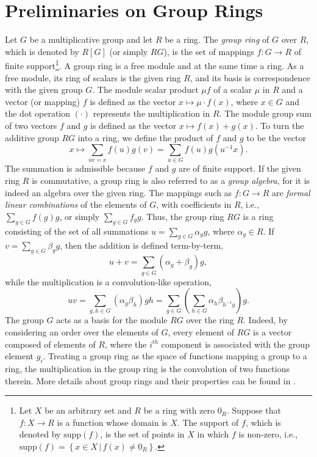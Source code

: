 \documentclass[journal,draftclsnofoot,onecolumn,12pt,twoside]{IEEEtran}
\begin{document}
\section{Preliminaries on Group Rings}\label{sec2}
Let $G$ be a multiplicative group and let $R$ be a ring. The \emph{group ring} of $G$ over $R$, which is denoted by $R[G]$ (or simply $RG$), is the set of mappings $f : G\rightarrow R$ of finite support\footnote{Let $X$ be an arbitrary set and $R$  be a ring with zero $0_R$. Suppose that $f : X\rightarrow R$ is a  function whose domain is $X$. The support of $f$, which is denoted by $\textrm{supp}(f)$, is the set of points in $X$ in which $f$ is non-zero, i.e., $\textrm{supp}(f)=\left\{x\in X\,|\,f(x)\neq 0_R\right\}$.}.
A group ring is a free module and at the same time a ring. As a free module, its ring of scalars is the given ring $R$, and its basis is correspondence with the given group $G$.
The module scalar product $\mu f$ of a scalar $\mu$ in $R$ and a vector (or mapping) $f$ is defined as the vector $ x\mapsto \mu \cdot f(x)$, where $x\in G$ and the dot operation $(\cdot)$ represents the multiplication in $R$.  The module group sum of two vectors $f$ and $g$ is defined as the vector  $x\mapsto f(x)+g(x)$. To turn the additive group $RG$ into a ring, we define the product of $f$ and $g$ to be the vector
\begin{equation}\label{group_ring_mult}
  x\mapsto \sum_{uv=x}f(u)g(v)=\sum_{u\in G}f(u)g(u^{-1}x).
\end{equation}
The summation is admissible because $f$ and $g$ are of finite support.
If the given ring $R$ is commutative, a group ring is also referred to as a \emph{group algebra}, for it is indeed an algebra over the given ring.
The mappings such as $f: G\rightarrow R$ are  \emph{formal linear combinations} of the elements of $G$, with coefficients in $R$, i.e., $\sum_{g\in G}f(g)g$, or simply $\sum_{g\in G}f_gg$.
Thus, the group ring $RG$ is a ring consisting of the set
of all summations $u=\sum_{g\in G}\alpha_g g$, where $\alpha_g\in R$. If $v=\sum_{g\in G}\beta_g g$, then the addition is defined term-by-term,
$$u+v=\sum_{g\in G}(\alpha_g+\beta_g) g,$$
while the multiplication is a convolution-like operation,
$$uv=\sum_{g,h\in G}(\alpha_g\beta_h) gh=\sum_{g\in G}\left(\sum_{h\in G}\alpha_{h}\beta_{h^{-1}g}\right)g.$$
The group $G$ acts as a basis for the module $RG$ over the ring $R$. Indeed, by considering an order over the elements of $G$, every element of
$RG$ is a vector composed of elements of $R$, where the $i^{th}$ component is associated
with the group element $g_i$. Treating a group ring as the space of functions mapping a group to a ring, the multiplication in the group ring is the convolution of two functions therein. More details about group rings and their properties can be found in \cite{29}.
\end{document}

